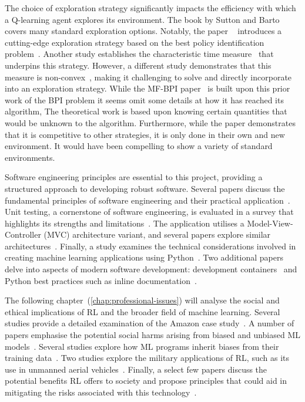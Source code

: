 \documentclass[]{final_report}
\begin{document}
The choice of exploration strategy significantly impacts the efficiency with which a Q-learning agent explores its environment. The book by Sutton and Barto~\cite{sutton2018reinforcement} covers many standard exploration options. Notably, the paper ~\cite{modelFree} introduces a cutting-edge exploration strategy based on the best policy identification problem~\cite{bestPolicyIdentifaction}. Another study establishes the characteristic time measure~\cite{characteristicTime} that underpins this strategy. However, a different study demonstrates that this measure is non-convex~\cite{characteristicTimeNonConvex}, making it challenging to solve and directly incorporate into an exploration strategy. While the MF-BPI paper~\cite{modelFree} is built upon this prior work of the BPI problem it seems omit some details at how it has reached its algorithm, The theoretical work is based upon knowing certain quantities that would be unknown to the algorithm. Furthermore, while the paper demonstrates that it is competitive to other strategies, it is only done in their own and new  environment. It would have been compelling to show a variety of standard environments.

Software engineering principles are essential to this project, providing a structured approach to developing robust software. Several papers discuss the fundamental principles of software engineering and their practical application~\cite{softwareEngineringPrinciples,van2008software}. Unit testing, a cornerstone of software engineering, is evaluated in a survey that highlights its strengths and limitations~\cite{unitTestingSurvey}. The application utilises a Model-View-Controller (MVC) architecture variant, and several papers explore similar architectures~\cite{webMVC, mvvm, gamesMVC}. Finally, a study examines the technical considerations involved in creating machine learning applications using Python~\cite{pythonMachineLearning}. Two additional papers delve into aspects of modern software development: development containers~\cite{developmentContainers} and Python best practices such as inline documentation~\cite{pythonAutoDoc}.

The following chapter~(\ref{chap:professional-issues}) will analyse the social and ethical implications of RL and the broader field of machine learning. Several studies provide a detailed examination of the Amazon  case study~\cite{facialRecognitionBias, legislatingRekognition, legislatingOG, rekognitionOverview}. A number of papers emphasise the potential social harms arising from biased and unbiased ML models~\cite{AISocialImpactAndAccountability,facialRecognitionBias, anprAccountability}. Several studies explore how ML programs inherit biases from their training data~\cite{LLMSocialEthicalRisks, AISocialImpactAndAccountability, facialRecognitionBias}. Two studies explore the military applications of RL, such as its use in unmanned aerial vehicles~\cite{rlMilitaryReviewChina, DRLDrones}. Finally, a select few papers discuss the potential benefits RL offers to society and propose principles that could aid in mitigating the risks associated with this technology~\cite{AIRisksAndPrinciples,deepRLsocietalImpact, ransbotham2017reshaping}.
\end{document}
